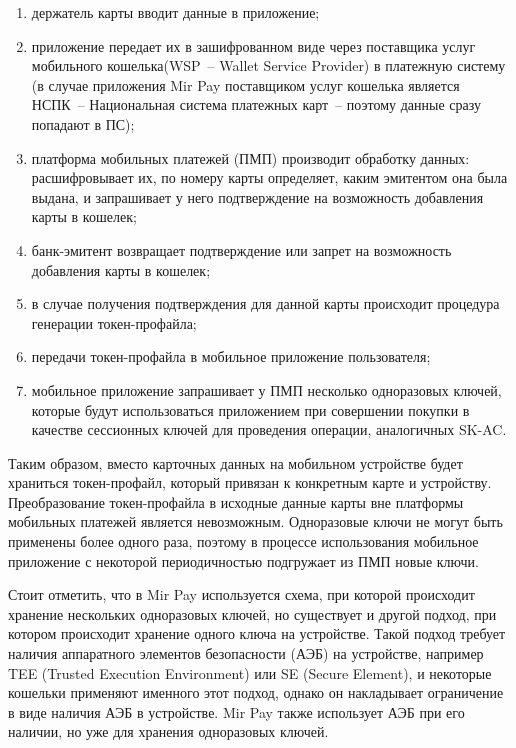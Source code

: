 \begin{enumerate}
    \item держатель карты вводит данные в приложение;
    \item приложение передает их в зашифрованном виде через поставщика услуг мобильного кошелька(WSP~-- Wallet Service Provider) в платежную систему (в случае приложения Mir Pay поставщиком услуг кошелька является НСПК~-- Национальная система платежных карт~-- поэтому данные сразу попадают в ПС);
    \item платформа мобильных платежей (ПМП) производит обработку данных: расшифровывает их, по номеру карты определяет, каким эмитентом она была выдана, и запрашивает у него подтверждение на возможность добавления карты в кошелек;
    \item банк-эмитент возвращает подтверждение или запрет на возможность добавления карты в кошелек;
    \item в случае получения подтверждения для данной карты происходит процедура генерации токен-профайла;
    \item передачи токен-профайла в мобильное приложение пользователя;
    \item мобильное приложение запрашивает у ПМП несколько одноразовых ключей, которые будут использоваться приложением при совершении покупки в качестве сессионных ключей для проведения операции, аналогичных SK-AC.
\end{enumerate}

Таким образом, вместо карточных данных на мобильном устройстве будет храниться токен-профайл, который привязан к конкретным карте и устройству.
Преобразование токен-профайла в исходные данные карты вне платформы мобильных платежей является невозможным.
Одноразовые ключи не могут быть применены более одного раза, поэтому в процессе использования мобильное приложение с некоторой периодичностью подгружает из ПМП новые ключи.


Стоит отметить, что в Mir Pay используется схема, при которой происходит хранение нескольких одноразовых ключей, но существует и другой подход, при котором происходит хранение одного ключа на устройстве.
Такой подход требует наличия аппаратного элементов безопасности (АЭБ) на устройстве, например TEE (Trusted Execution Environment) или SE (Secure Element), и некоторые кошельки применяют именного этот подход, однако он накладывает ограничение в виде наличия АЭБ в устройстве.
Mir Pay также использует АЭБ при его наличии, но уже для хранения одноразовых ключей.


